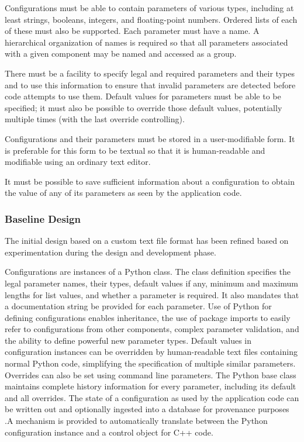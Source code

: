 \documentclass[DM,toc]{lsstdoc}
\begin{document}
Configurations must be able to contain parameters of various types,
including at least strings, booleans, integers, and floating-point
numbers. Ordered lists of each of these must also be supported. Each
parameter must have a name. A hierarchical organization of names is
required so that all parameters associated with a given component may be
named and accessed as a group.

There must be a facility to specify legal and required parameters and
their types and to use this information to ensure that invalid
parameters are detected before code attempts to use them. Default values
for parameters must be able to be specified; it must also be possible to
override those default values, potentially multiple times (with the last
override controlling).

Configurations and their parameters must be stored in a user-modifiable
form. It is preferable for this form to be textual so that it is
human-readable and modifiable using an ordinary text editor.

It must be possible to save sufficient information about a configuration
to obtain the value of any of its parameters as seen by the application
code.

\subsubsection{Baseline Design}\label{configuration-design}

The initial design based on a custom text file format has been refined
based on experimentation during the design and development phase.

Configurations are instances of a Python class. The class definition
specifies the legal parameter names, their types, default values if any,
minimum and maximum lengths for list values, and whether a parameter is
required. It also mandates that a documentation string be provided for
each parameter. Use of Python for defining configurations enables
inheritance, the use of package imports to easily refer to
configurations from other components, complex parameter validation, and
the ability to define powerful new parameter types. Default values in
configuration instances can be overridden by human-readable text files
containing normal Python code, simplifying the specification of multiple
similar parameters. Overrides can also be set using command line
parameters. The Python base class maintains complete history information
for every parameter, including its default and all overrides. The state
of a configuration as used by the application code can be written out
and optionally ingested into a database for provenance purposes .A
mechanism is provided to automatically translate between the Python
configuration instance and a control object for C++ code.
\end{document}

